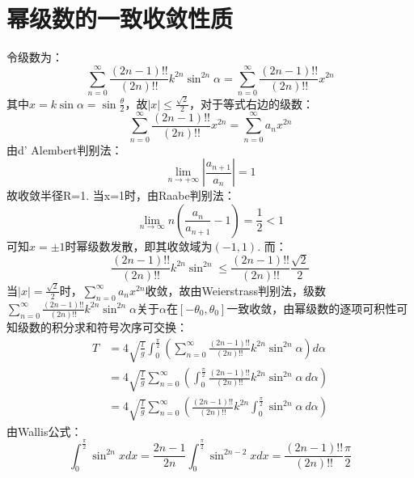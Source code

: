 \documentclass{jams-l}
\theoremstyle{definition}
\theoremstyle{remark}
\numberwithin{equation}{section}
\begin{document}
\section{幂级数的一致收敛性质}
令级数为：
\begin{equation}
    \sum_{n=0}^{\infty}\frac{(2n-1)!!}{(2n)!!}k^{2n}\sin^{2n} \alpha=\sum_{n=0}^{\infty}\frac{(2n-1)!!}{(2n)!!}x^{2n}
\end{equation}
其中$x=k\sin \alpha=\sin \frac{\theta}{2}$，故$|x|\leq \frac{\sqrt{2}}{2}$，对于等式右边的级数：
\begin{equation}
    \sum_{n=0}^{\infty}\frac{(2n-1)!!}{(2n)!!}x^{2n}=\sum_{n=0}^{\infty} a_n x^{2n}
\end{equation}
由d' Alembert判别法：
\begin{equation}
    \lim_{n\to +\infty} \left| \frac{a_{n+1}}{a_n}\right|=1
\end{equation}
故收敛半径R=1. 当x=1时，由Raabe判别法：
\begin{equation}
    \lim_{n\to \infty} n\left( \frac{a_n}{a_{n+1}}-1\right)=\frac{1}{2}<1
\end{equation}
可知$x=\pm 1$时幂级数发散，即其收敛域为$(-1,1)$. 而：
\begin{equation}
    \frac{(2n-1)!!}{(2n)!!}k^{2n}\sin^{2n}\leq \frac{(2n-1)!!}{(2n)!!}\frac{\sqrt{2}}{2}
\end{equation}
当$|x|= \frac{\sqrt{2}}{2}$时，$\sum_{n=0}^{\infty} a_n x^{2n}$收敛，故由Weierstrass判别法，级数$\sum_{n=0}^{\infty}\frac{(2n-1)!!}{(2n)!!}k^{2n}\sin^{2n} \alpha$关于$\alpha$在$[-\theta_0, \theta_0]$一致收敛，由幂级数的逐项可积性可知级数的积分求和符号次序可交换：
\begin{equation}
\begin{aligned}
    T&=4\sqrt{\frac{l}{g}}\int_0^{\frac{\pi}{2}} \left(\sum_{n=0}^{\infty}\frac{(2n-1)!!}{(2n)!!}k^{2n}\sin^{2n} \alpha\right) d\alpha\\
    &=4\sqrt{\frac{l}{g}} \sum_{n=0}^{\infty}\left(\int_0^{\frac{\pi}{2}}\frac{(2n-1)!!}{(2n)!!}k^{2n}\sin^{2n} \alpha \ d\alpha\right) \\
    &=4\sqrt{\frac{l}{g}} \sum_{n=0}^{\infty}\left(\frac{(2n-1)!!}{(2n)!!}k^{2n}\int_0^{\frac{\pi}{2}}\sin^{2n} \alpha \ d\alpha\right)
\end{aligned}
\end{equation}
由Wallis公式：
\begin{equation}
    \int_{0}^{\frac{\pi}{2}} \sin^{2n} x dx=\frac{2n-1}{2n} \int_{0}^{\frac{\pi}{2}} \sin^{2n-2} x dx=\frac{(2n-1)!!}{(2n)!!} \frac{\pi}{2}
\end{equation}
\end{document}
